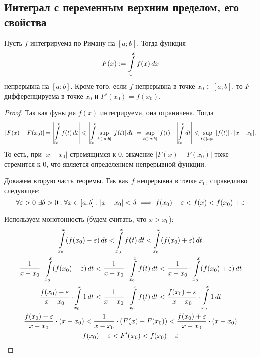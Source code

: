 \documentclass[a4paper]{article}
\theoremstyle{named}
\renewcommand{\int}{\intop}
\begin{document}
        \subsection{Интеграл с переменным верхним пределом, его свойства}

        \begin{theorem*}
            Пусть $f$ интегрируема по Риману на $[a; b]$. Тогда функция
            \begin{equation*}
                F(x) := \int_a^x f(x) \dd x
            \end{equation*}
            непрерывна на $[a; b]$. Кроме того, если $f$ непрерывна в точке $x_0 \in [a; b]$, то $F$ дифференцируема в точке $x_0$ и $F'(x_0) = f(x_0)$.
        \end{theorem*}

        \begin{proof}
            Так как функция $f(x)$ интегрируема, она ограничена. Тогда
            \begin{equation*}
                \left|F(x) - F(x_0)\right| = \left|\int_{x_0}^x f(t) \dd t\right| \leq \left|\int_{x_0}^x \sup_{t \in [a; b]} |f(t)| \dd t\right| = \sup_{t \in [a; b]} |f(t)| \cdot \left|\int_{x_0}^x \dd t\right| \leq \sup_{t \in [a; b]} |f(t)| \cdot |x - x_0|.
            \end{equation*}
            То есть, при $|x - x_0|$ стремящимся к $0$, значение $|F(x) - F(x_0)|$ тоже стремится к $0$, что является определением непрерывной функции.

            Докажем вторую часть теоремы. Так как $f$ непрерывна в точке $x_0$, справедливо следующее:
            \begin{equation*}
                \forall \varepsilon > 0 \ \exists \delta > 0: \forall x \in [a; b]: |x - x_0| < \delta \implies f(x_0) - \varepsilon < f(x) < f(x_0) + \varepsilon
            \end{equation*}

            Используем монотонность (будем считать, что $x > x_0$):
            \[\begin{gathered}
                \int_{x_0}^x (f(x_0) - \eps) \dd t < \int_{x_0}^x f(t) \dd t < \int_{x_0}^x (f(x_0) + \eps) \dd t \\
                \dfrac{1}{x - x_0} \cdot \int_{x_0}^x (f(x_0) - \eps) \dd t < \dfrac{1}{x - x_0} \cdot  \int_{x_0}^x f(t) \dd t < \dfrac{1}{x - x_0} \cdot \int_{x_0}^x (f(x_0) + \eps) \dd t \\
                \dfrac{f(x_0) - \eps}{x - x_0} \cdot \int_{x_0}^x 1 \dd t < \dfrac{1}{x - x_0} \cdot  \int_{x_0}^x f(t) \dd t < \dfrac{f(x_0) + \eps}{x - x_0} \cdot \int_{x_0}^x 1 \dd t \\
                \dfrac{f(x_0) - \eps}{x - x_0} \cdot (x - x_0) < \dfrac{1}{x - x_0} \cdot (F(x) - F(x_0)) < \dfrac{f(x_0) + \eps}{x - x_0} \cdot (x - x_0) \\
                f(x_0) - \eps < F'(x_0) < f(x_0) + \eps \\
            \end{gathered}\] 
        \end{proof}
\end{document}
